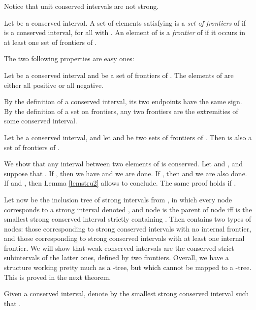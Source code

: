\documentclass{article}
\begin{document}
Notice that unit conserved intervals are not strong.

\begin{definition}
Let  be a  conserved interval.  A set
 of elements satisfying  is a
\emph{set of frontiers} of  if  is a conserved
interval, for all  with . An element of  is
a \emph{frontier} of  if it occurs in at least one set of frontiers
of .
\end{definition}

The two following properties are easy ones:

\begin{lemma}\label{lemstru1}
Let  be a conserved interval and  be a set of frontiers of .
 The elements of   are either all positive or all negative.
\end{lemma}
\begin{preuve}
 By the definition of a conserved interval, its two endpoints have the
 same sign. By the definition of a set on frontiers, any two frontiers 
 are the extremities of some conserved interval.
\end{preuve}


\begin{lemma}
\label{unionfrontier}
Let  be a conserved interval, and  let  and
 be two sets of frontiers of . Then  is
also a set of frontiers of .
\end{lemma}
\begin{preuve}
We show that any interval between two elements of  
is conserved. Let
 and , and suppose that . If , then we have
 and we are done.  If , then
 and we are also done. If  and , 
then Lemma \ref{lemstru2} allows to conclude.
The same proof holds if .
\end{preuve}

Let now  be the inclusion tree of strong intervals from , in which
every node  corresponds to a strong interval denoted , and 
node  is the parent of node  iff  is the  smallest strong
conserved interval strictly containing . Then 
contains two types of nodes: those corresponding to strong conserved 
intervals with no internal frontier, and those corresponding to strong 
conserved intervals with at least one internal frontier. We will show that 
weak conserved  intervals are the conserved strict subintervals of the latter ones, defined by two frontiers.
Overall, we have a structure working pretty much as a -tree, but which 
cannot be mapped to a -tree. This is proved in the next theorem.

Given a conserved interval, denote by  
the smallest strong conserved interval such that .  
\end{document}
